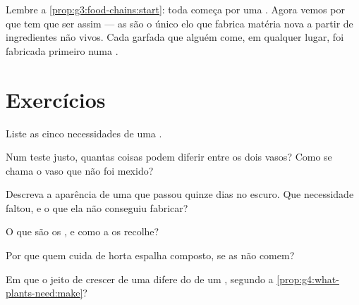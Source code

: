 \begin{remark}\label{rem:g4:what-plants-need:everyone}
Lembre a \cref{prop:g3:food-chains:start}: toda 
começa por uma . Agora vemos por que tem que ser assim --- as
 são o único elo que fabrica matéria nova a partir de
ingredientes não vivos. Cada garfada que alguém come, em qualquer
lugar, foi fabricada primeiro numa .
\end{remark}

\section{Exercícios}

\begin{exercise}[$\star$]\label{exo:g4:what-plants-need:1}
Liste as cinco necessidades de uma .
\end{exercise}

\begin{exercise}[$\star$]\label{exo:g4:what-plants-need:2}
Num teste justo, quantas coisas podem diferir entre os dois vasos?
Como se chama o vaso que não foi mexido?
\end{exercise}

\begin{exercise}[$\star$]\label{exo:g4:what-plants-need:3}
Descreva a aparência de uma  que passou quinze dias no escuro.
Que necessidade faltou, e o que ela não conseguiu fabricar?
\end{exercise}

\begin{exercise}[$\star$]\label{exo:g4:what-plants-need:4}
O que são os , e como a  os recolhe?
\end{exercise}

\begin{exercise}[$\star$]\label{exo:g4:what-plants-need:5}
Por que quem cuida de horta espalha composto, se as  não
comem?
\end{exercise}

\begin{exercise}[$\star$]\label{exo:g4:what-plants-need:6}
Em que o jeito de crescer de uma  difere do de um ,
segundo a \cref{prop:g4:what-plants-need:make}?
\end{exercise}

